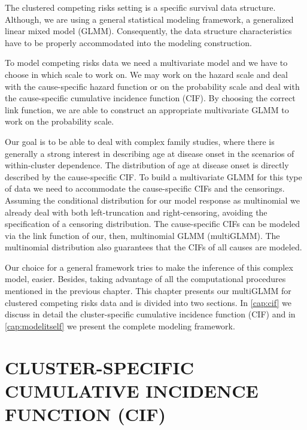 The clustered competing risks setting is a specific survival data
structure. Although, we are using a general statistical modeling
framework, a generalized linear mixed model (GLMM). Consequently, the
data structure characteristics have to be properly accommodated into the
modeling construction.

To model competing risks data we need a multivariate model and we have
to choose in which scale to work on. We may work on the hazard scale and
deal with the cause-specific hazard function or on the probability scale
and deal with the cause-specific cumulative incidence function (CIF).
By choosing the correct link function, we are able to construct an
appropriate multivariate GLMM to work on the probability scale.

Our goal is to be able to deal with complex family studies, where there
is generally a strong interest in describing age at disease onset in the
scenarios of within-cluster dependence. The distribution of age at
disease onset is directly described by the cause-specific CIF. To build
a multivariate GLMM for this type of data we need to accommodate the
cause-specific CIFs and the censorings. Assuming the conditional
distribution for our model response as multinomial we already deal with
both left-truncation and right-censoring, avoiding the specification of
a censoring distribution.  The cause-specific CIFs can be modeled via
the link function of our, then, multinomial GLMM (multiGLMM). The
multinomial distribution also guarantees that the CIFs of all causes are
modeled.

Our choice for a general framework tries to make the inference of this
complex model, easier. Besides, taking advantage of all the
computational procedures mentioned in the previous chapter. This chapter
presents our multiGLMM for clustered competing risks data and is divided
into two sections. In \autoref{cap:cif} we discuss in detail the
cluster-specific cumulative incidence function (CIF) and in
\autoref{cap:modelitself} we present the complete modeling framework.

\section{CLUSTER-SPECIFIC CUMULATIVE INCIDENCE FUNCTION (CIF)}
\label{cap:cif}

